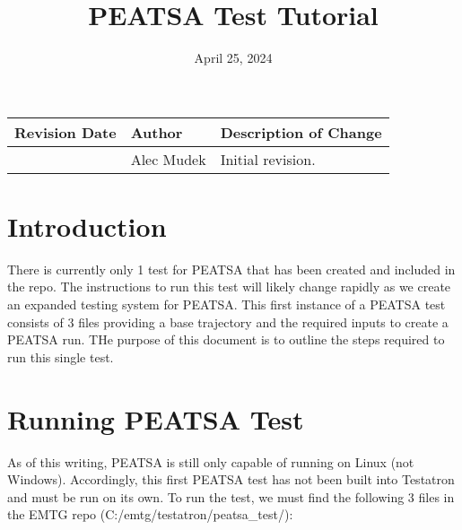 \documentclass[11pt]{article}
\title{\Huge PEATSA Test Tutorial}
\newcommand{\knownissue}[3]
{
	\refstepcounter{knownissues}
	\par\noindent\textbf{\hyperref[#2_b]{\theknownissues\quad #1}}\label{#2_h}
	\textbf{\hfill\pageref{#2_b}}
	#3
}
\begin{document}
\begin{titlepage}
\maketitle
\thispagestyle{empty}
\begin{table}[H]
	\centering
	\begin{tabularx}{\textwidth}{|l|l|X|}
		\hline
		\textbf{Revision Date} & \textbf{Author} & \textbf{Description of Change} \\
		\hline
		\date{April 25, 2024} & Alec Mudek & Initial revision.\\ 
		\hline
	\end{tabularx}
\end{table}
\end{titlepage}

\newpage
\tableofcontents
\thispagestyle{empty}
\newpage

\listofknownissues
\thispagestyle{empty}


\newpage
\clearpage
\setcounter{page}{1}


\section{Introduction}
\label{sec:introduction}

There is currently only 1 test for PEATSA that has been created and included in the repo. The instructions to run this test will likely change rapidly as we create an expanded testing system for PEATSA. This first instance of a PEATSA test consists of 3 files providing a base trajectory and the required inputs to create a PEATSA run. THe purpose of this document is to outline the steps required to run this single test.

\section{Running PEATSA Test}
\label{sec:peatsa_test}

As of this writing, PEATSA is still only capable of running on Linux (not Windows). Accordingly, this first PEATSA test has not been built into Testatron and must be run on its own. To run the test, we must find the following 3 files in the EMTG repo (C:/emtg/testatron/peatsa\_test/):
\end{document}
